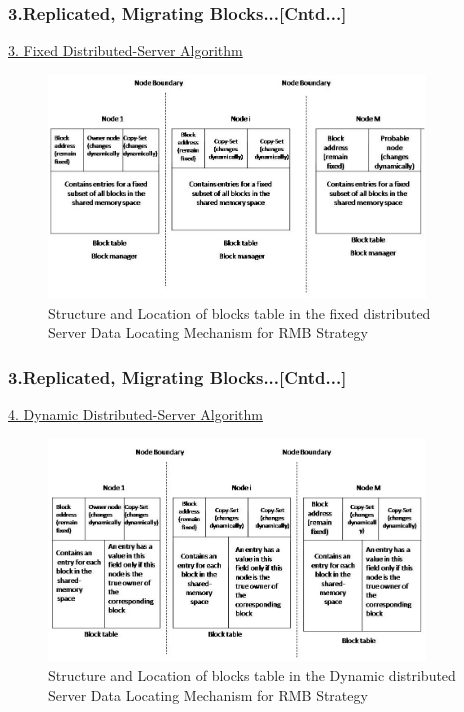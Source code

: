 \documentclass{beamer}
\begin{document}
\begin{frame}
	\frametitle{3.Replicated, Migrating Blocks...[Cntd...]}
	\vspace{0.25cm}
	\underline{3. Fixed Distributed-Server Algorithm}
	\begin{figure}
		\centering
		\includegraphics[width=10cm]{fig514.jpg}
		\caption{Structure and Location of blocks table in the fixed distributed Server Data Locating Mechanism for RMB Strategy}
		\label{fig514}
	\end{figure}
\end{frame}

\begin{frame}
	\frametitle{3.Replicated, Migrating Blocks...[Cntd...]}
	\vspace{0.25cm}
	\underline{4. Dynamic Distributed-Server Algorithm}
	\begin{figure}
		\centering
		\includegraphics[width=10cm]{fig515.jpg}
		\caption{Structure and Location of blocks table in the Dynamic distributed Server Data Locating Mechanism for RMB Strategy}
		\label{fig515}
	\end{figure}
\end{frame}
\end{document}

